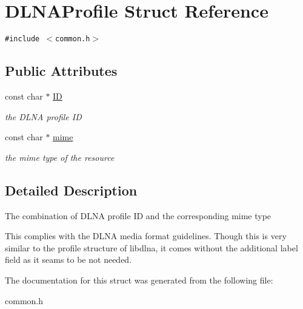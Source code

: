 \hypertarget{structDLNAProfile}{
\section{DLNAProfile Struct Reference}
\label{structDLNAProfile}
}
{\tt \#include $<$common.h$>$}

\subsection*{Public Attributes}
\begin{CompactItemize}
\item 
\hypertarget{structDLNAProfile_4957399cd872c2d843a35a886f9a6a5a}{
const char $\ast$ \hyperlink{structDLNAProfile_4957399cd872c2d843a35a886f9a6a5a}{ID}}
\label{structDLNAProfile_4957399cd872c2d843a35a886f9a6a5a}

\begin{CompactList}\small\item\em the DLNA profile ID \item\end{CompactList}\item 
\hypertarget{structDLNAProfile_79dc39f6af5a840901ad09617792cb41}{
const char $\ast$ \hyperlink{structDLNAProfile_79dc39f6af5a840901ad09617792cb41}{mime}}
\label{structDLNAProfile_79dc39f6af5a840901ad09617792cb41}

\begin{CompactList}\small\item\em the mime type of the resource \item\end{CompactList}\end{CompactItemize}


\subsection{Detailed Description}
The combination of DLNA profile ID and the corresponding mime type

This complies with the DLNA media format guidelines. Though this is very similar to the profile structure of libdlna, it comes without the additional label field as it seams to be not needed. 

The documentation for this struct was generated from the following file:\begin{CompactItemize}
\item 
common.h\end{CompactItemize}
